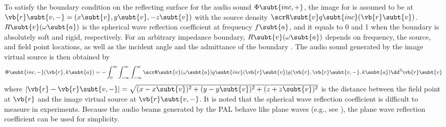 To satisfy the boundary condition on the reflecting surface for the audio sound $\Phi\subt{inc,+}$, the image for  is assumed to be at $\vb{r}\subt{v,-} = (x\subt{v}, y\subt{v}, -z\subt{v})$ with the source density $\scrR \subt{v} q\subt{inc}(\vb{r}\subt{v})$.
$R\subt{v}(\omega\subt{a})$ is the spherical wave reflection coefficient at frequency $f\subt{a}$, and it equals to 0 and 1 when the boundary is absolutely soft and rigid, respectively. 
For an arbitrary impedance boundary, $R\subt{v}(\omega\subt{a})$ depends on frequency, the source, and field point locations, as well as the incident angle and the admittance of the boundary \cite{Rudnick1947PropagationAcousticWave}.
The audio sound generated by the image virtual source is then obtained by 
\begin{equation}
    \Phi\subt{inc,-}(\vb{r},k\subt{a})
    = -
    \int_0^\infty \int_{-\infty}^\infty \int_{-\infty}^\infty
    \scrR\subt{v}(\omega\subt{a}) 
    q\subt{inc}(\vb{r}\subt{v}) 
    g(\vb{r},\vb{r}\subt{v,-},k\subt{a})
    \dd^3 \vb{r}\subt{v}
    \label{eq:reflection_potential_inc_minus}
\end{equation}
where $|\vb{r}-\vb{r}\subt{v,-}| = \sqrt{(x-x\subt{v})^2 + (y-y\subt{v})^2 + (z+z\subt{v})^2}$ is the distance between the field point at $\vb{r}$ and the image virtual source at $\vb{r}\subt{v,-}$.
It is noted that the spherical wave reflection coefficient is difficult to measure in experiments.
Because the audio beams generated by the PAL behave like plane waves (e.g., see \cite{Castagnede2008LowFrequencySitu}), the plane wave reflection coefficient can be used for simplicity.

